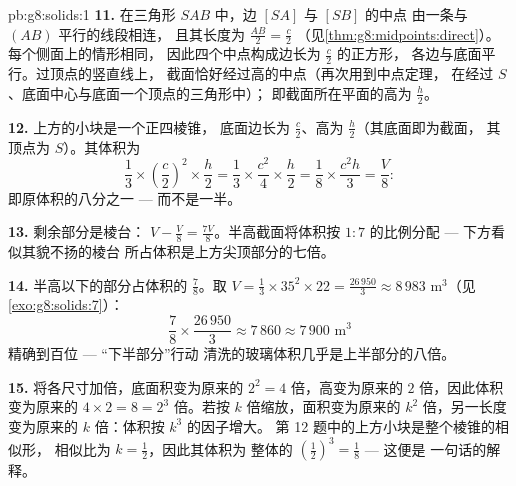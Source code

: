 \begin{solution}{pb:g8:solids:1}
\textbf{11.} 在三角形 $SAB$ 中，边 $[SA]$ 与 $[SB]$ 的中点
由一条与 $(AB)$ 平行的线段相连，
且其长度为 $\frac{AB}{2} = \frac{c}{2}$
（见\cref{thm:g8:midpoints:direct}）。每个侧面上的情形相同，
因此四个中点构成边长为 $\frac c2$ 的正方形，
各边与底面平行。过顶点的竖直线上，
截面恰好经过高的中点（再次用到中点定理，
在经过 $S$、底面中心与底面一个顶点的三角形中）；
即截面所在平面的高为 $\frac h2$。

\textbf{12.} 上方的小块是一个正四棱锥，
底面边长为 $\frac c2$、高为 $\frac h2$（其底面即为截面，
其顶点为 $S$）。其体积为
\[
\frac13 \times \left(\frac c2\right)^2 \times \frac h2
= \frac13 \times \frac{c^2}{4} \times \frac h2
= \frac{1}{8} \times \frac{c^2 h}{3}
= \frac{V}{8} :
\]
即原体积的八分之一 --- 而不是一半。

\textbf{13.} 剩余部分是棱台：
$V - \frac V8 = \frac{7V}{8}$。半高截面将体积按
$1 : 7$ 的比例分配 --- 下方看似其貌不扬的棱台
所占体积是上方尖顶部分的七倍。

\textbf{14.} 半高以下的部分占体积的 $\frac78$。取
$V = \frac13 \times 35^2 \times 22 = \frac{26\,950}{3} \approx
8\,983$ m$^3$（见\cref{exo:g8:solids:7}）：
\[
\frac78 \times \frac{26\,950}{3} \approx 7\,860 \approx
7\,900 \text{ m}^3
\]
精确到百位 --- “下半部分”行动
清洗的玻璃体积几乎是上半部分的八倍。

\textbf{15.} 将各尺寸加倍，底面积变为原来的
$2^2 = 4$ 倍，高变为原来的 $2$ 倍，因此体积变为原来的
$4 \times 2 = 8 = 2^3$ 倍。若按 $k$ 倍缩放，面积变为原来的 $k^2$
倍，另一长度变为原来的 $k$ 倍：体积按 $k^3$ 的因子增大。
第 12 题中的上方小块是整个棱锥的相似形，
相似比为 $k = \frac12$，因此其体积为
整体的 $\left(\frac12\right)^3 = \frac18$ --- 这便是
一句话的解释。
\end{solution}

